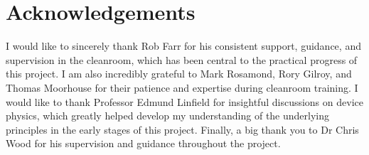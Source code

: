\cleardoublepage
\chapter*{Acknowledgements}

I would like to sincerely thank Rob Farr for his consistent support,
guidance, and supervision in the cleanroom, which has been central to
the practical progress of this project. I am also incredibly grateful to Mark Rosamond, Rory Gilroy, and Thomas Moorhouse for their patience and
expertise during cleanroom training. I would like to thank Professor Edmund Linfield for insightful
discussions on device physics, which greatly helped develop my understanding of the underlying principles in the early stages of this project. Finally, a big thank you
to Dr Chris Wood for his supervision and guidance throughout the project.